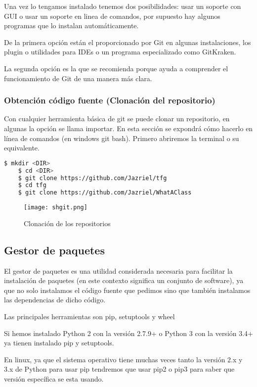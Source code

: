 Una vez lo tengamos instalado tenemos dos posibilidades: usar un soporte con GUI o usar un soporte en linea de comandos, por supuesto hay algunos programas que lo instalan automáticamente.

De la primera opción están el proporcionado por Git en algunas instalaciones, los plugin o utilidades para IDEs o un programa especializado como GitKraken.

La segunda opción es la que se recomienda porque ayuda a comprender el funcionamiento de Git de una manera más clara.


\subsubsection{Obtención código fuente (Clonación del repositorio)}

Con cualquier herramienta básica de git se puede clonar un repositorio, en algunas la opción se llama importar. En esta sección se expondrá cómo hacerlo en línea de comandos (en windows git bash). Primero abriremos la terminal o su equivalente.

\begin{lstlisting}[language=bash]
    $ mkdir <DIR>
    $ cd <DIR>
    $ git clone https://github.com/Jazriel/tfg
    $ cd tfg
    $ git clone https://github.com/Jazriel/WhatAClass
\end{lstlisting}


\begin{figure}
	\centering
	\texttt{[image: shgit.png]}
	\caption{Clonación de los repositorios}\label{fig:shgit.png}
\end{figure}

\subsection{Gestor de paquetes}

El gestor de paquetes es una utilidad considerada necesaria para facilitar la instalación de paquetes (en este contexto significa un conjunto de software), ya que no solo instalamos el código fuente que pedimos sino que también instalamos las dependencias de dicho código.

Las principales herramientas son pip, setuptools y wheel

Si hemos instalado Python 2 con la versión 2.7.9+ o Python 3 con la versión 3.4+ ya tienen instalado pip y setuptools.

En linux, ya que el sistema operativo tiene muchas veces tanto la versión 2.x y 3.x de Python para usar pip tendremos que usar pip2 o pip3 para saber que versión específica se esta usando.

